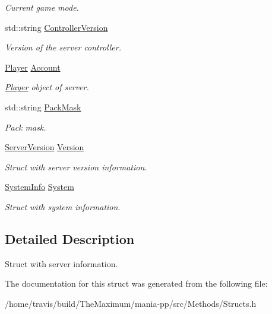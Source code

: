 \begin{DoxyCompactItemize}
\begin{DoxyCompactList}\small\item\em Current game mode. \end{DoxyCompactList}\item 
\hypertarget{structServerInfo_af708f8b3545fe87a6c86bbcebf14dc34}{std\-::string \hyperlink{structServerInfo_af708f8b3545fe87a6c86bbcebf14dc34}{Controller\-Version}}\label{structServerInfo_af708f8b3545fe87a6c86bbcebf14dc34}

\begin{DoxyCompactList}\small\item\em Version of the server controller. \end{DoxyCompactList}\item 
\hypertarget{structServerInfo_a4ce1342cad06ef64048b368ce0dec575}{\hyperlink{structPlayer}{Player} \hyperlink{structServerInfo_a4ce1342cad06ef64048b368ce0dec575}{Account}}\label{structServerInfo_a4ce1342cad06ef64048b368ce0dec575}

\begin{DoxyCompactList}\small\item\em \hyperlink{structPlayer}{Player} object of server. \end{DoxyCompactList}\item 
\hypertarget{structServerInfo_a3b31d3c315156f16d54650a99661ed0f}{std\-::string \hyperlink{structServerInfo_a3b31d3c315156f16d54650a99661ed0f}{Pack\-Mask}}\label{structServerInfo_a3b31d3c315156f16d54650a99661ed0f}

\begin{DoxyCompactList}\small\item\em Pack mask. \end{DoxyCompactList}\item 
\hypertarget{structServerInfo_acf8188cc44967ffa44dc23e14dfe0cd7}{\hyperlink{structServerVersion}{Server\-Version} \hyperlink{structServerInfo_acf8188cc44967ffa44dc23e14dfe0cd7}{Version}}\label{structServerInfo_acf8188cc44967ffa44dc23e14dfe0cd7}

\begin{DoxyCompactList}\small\item\em Struct with server version information. \end{DoxyCompactList}\item 
\hypertarget{structServerInfo_a97727217c6b07430e5d377668567f623}{\hyperlink{structSystemInfo}{System\-Info} \hyperlink{structServerInfo_a97727217c6b07430e5d377668567f623}{System}}\label{structServerInfo_a97727217c6b07430e5d377668567f623}

\begin{DoxyCompactList}\small\item\em Struct with system information. \end{DoxyCompactList}\end{DoxyCompactItemize}


\subsection{Detailed Description}
Struct with server information. 

The documentation for this struct was generated from the following file\-:\begin{DoxyCompactItemize}
\item 
/home/travis/build/\-The\-Maximum/mania-\/pp/src/\-Methods/Structs.\-h\end{DoxyCompactItemize}
